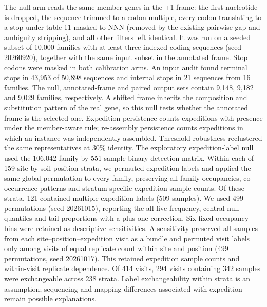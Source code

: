 The null arm reads the same member genes in the +1 frame: the first nucleotide is dropped, the
sequence trimmed to a codon multiple, every codon translating to a stop under table 11 masked to NNN
(removed by the existing pairwise gap and ambiguity stripping), and all other filters left identical.
It was run on a seeded subset of 10{,}000 families with at least three indexed coding
sequences (seed 20260920), together with the same input subset in the annotated frame. Stop
codons were masked in both calibration arms. An input audit found terminal stops in 43{,}953 of
50{,}898 sequences and internal stops in 21 sequences from 16 families. The null, annotated-frame and paired output sets
contain 9{,}148, 9{,}182 and 9{,}029 families, respectively. A shifted frame inherits the composition and
substitution pattern of the real gene, so this null tests whether the annotated frame is the selected
one. Expedition persistence counts
expeditions with presence under the member-aware rule; re-assembly persistence counts expeditions in
which an instance was independently assembled. Threshold robustness reclustered the same
representatives at 30\% identity.
The exploratory expedition-label null used the 106{,}042-family by 551-sample binary detection matrix. Within each of 159 site-by-soil-position strata, we permuted expedition labels and applied the same global permutation to every family, preserving all family occupancies, co-occurrence patterns and stratum-specific expedition sample counts. Of these strata, 121 contained multiple expedition labels (509 samples). We used 499 permutations (seed 20261015), reporting the all-five frequency, central null quantiles and tail proportions with a plus-one correction. Six fixed occupancy bins were retained as descriptive sensitivities. A sensitivity preserved all samples from each site--position--expedition visit as a bundle and permuted visit labels only among visits of equal replicate count within site and position (499 permutations, seed 20261017). This retained expedition sample counts and within-visit replicate dependence. Of 414 visits, 294 visits containing 342 samples were exchangeable across 238 strata. Label exchangeability within strata is an assumption; sequencing and mapping differences associated with expedition remain possible explanations.

